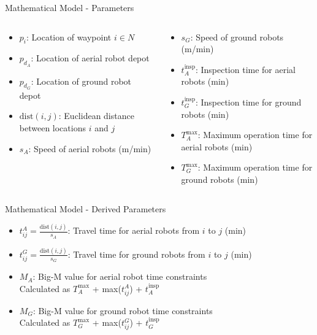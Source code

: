\documentclass[aspectratio=169,11pt,xcolor={dvipsnames},hyperref={pdftex,pdfpagemode=UseNone,hidelinks,pdfdisplaydoctitle=true},usepdftitle=false]{beamer}
\begin{document}
  \begin{frame}{Mathematical Model - Parameters}
    \begin{columns}[c]
      \begin{column}{0.48\textwidth}
        \begin{itemize}
          \item $p_i$: Location of waypoint $i \in N$
          \item $p_{d_A}$: Location of aerial robot depot
          \item $p_{d_G}$: Location of ground robot depot
          \item $\text{dist}(i,j)$: Euclidean distance between locations $i$ and $j$
          \item $s_A$: Speed of aerial robots (m/min)
        \end{itemize}
      \end{column}
      \begin{column}{0.48\textwidth}
        \begin{itemize}
          \item $s_G$: Speed of ground robots (m/min)
          \item $t_A^{\text{insp}}$: Inspection time for aerial robots (min)
          \item $t_G^{\text{insp}}$: Inspection time for ground robots (min)
          \item $T_A^{\max}$: Maximum operation time for aerial robots (min)
          \item $T_G^{\max}$: Maximum operation time for ground robots (min)
        \end{itemize}
      \end{column}
    \end{columns}
  \end{frame}

  \begin{frame}{Mathematical Model - Derived Parameters}
    \begin{itemize}
      \item $t_{ij}^{A} = \frac{\text{dist}(i,j)}{s_A}$: Travel time for aerial robots from $i$ to $j$ (min)
      \item $t_{ij}^{G} = \frac{\text{dist}(i,j)}{s_G}$: Travel time for ground robots from $i$ to $j$ (min)
      \item $M_A$: Big-M value for aerial robot time constraints\\
            Calculated as $T_A^{\max}$ + max($t_{ij}^{A}$) + $t_A^{\text{insp}}$
      \item $M_G$: Big-M value for ground robot time constraints\\
            Calculated as $T_G^{\max}$ + max($t_{ij}^{G}$) + $t_G^{\text{insp}}$
    \end{itemize}
  \end{frame}
\end{document}
